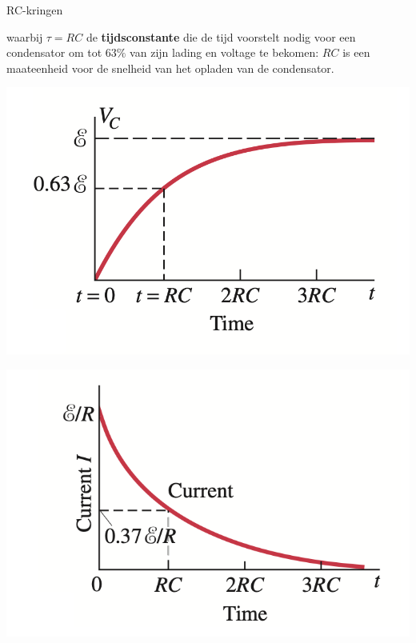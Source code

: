 \begin{app}[RC-kringen]{RC-kringen}
    
    \noindent waarbij $\tau = RC$ de \textbf{tijdsconstante} die de tijd voorstelt nodig voor een condensator om tot $ 63\%$ van zijn lading en voltage te bekomen: $RC$ is een maateenheid voor de snelheid van het opladen van de condensator. \\
    \vspace{-0.2cm}

    \begin{minipage}{0.48\textwidth}
        \vspace{0.21cm}\hspace{1.4cm}\includegraphics[scale = 0.195]{Images/Elektriciteit/Tijdsconstante1.png}
    \end{minipage}
    \begin{minipage}{0.48\textwidth}
        \includegraphics[scale = 0.23]{Images/Elektriciteit/Tijdsconstante2.png}
    \end{minipage}
    

\end{app}
